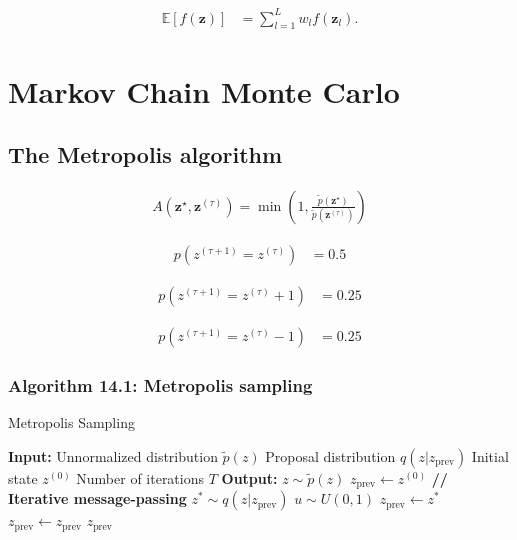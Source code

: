 \documentclass{article}
\begin{document}
\begin{align*}
\mathbb{E}[
f(\mathbf{z})]
& =\sum_{l=1}^{L} w_{l} f\left(\mathbf{z}_{l}\right) .
\tag{14.26}
\end{align*}

\section{Markov Chain Monte Carlo}
\subsection{The Metropolis algorithm}

\begin{align*}
A\left(\mathbf{z}^{\star}, \mathbf{z}^{(\tau)}\right)=\min \left(1, \frac{\widetilde{p}\left(\mathbf{z}^{\star}\right)}{\widetilde{p}\left(\mathbf{z}^{(\tau)}\right)}\right) \tag{14.27}
\end{align*}

\begin{align*}
p\left(z^{(\tau+1)}=z^{(\tau)}\right) & =0.5  \tag{14.28}
\end{align*}

\begin{align*}
p\left(z^{(\tau+1)}=z^{(\tau)}+1\right) & =0.25  \tag{14.29}
\end{align*}

\begin{align*}
p\left(z^{(\tau+1)}=z^{(\tau)}-1\right) & =0.25
\tag{14.30}
\end{align*}

\subsubsection{Algorithm 14.1: Metropolis sampling}

\begin{algorithm}[H]
\caption{Metropolis Sampling}
\begin{algorithmic}[1]
\STATE \textbf{Input:} Unnormalized distribution $\tilde{p}(z)$
\STATE \quad Proposal distribution $q(z | z_{\text{prev}})$
\STATE \quad Initial state $z^{(0)}$
\STATE \quad Number of iterations $T$
\STATE \textbf{Output:} $z \sim \tilde{p}(z)$
\STATE $z_{\text{prev}} \gets z^{(0)}$
\STATE \textbf{// Iterative message-passing}
    \STATE $z^* \sim q(z | z_{\text{prev}})$ 
    \STATE $u \sim U(0, 1)$ 
        \STATE $z_{\text{prev}} \gets z^*$ 
    \ELSE
        \STATE $z_{\text{prev}} \gets z_{\text{prev}}$ 
    \ENDIF
\ENDFOR
\RETURN $z_{\text{prev}}$ 
\end{algorithmic}
\end{algorithm}
\end{document}
